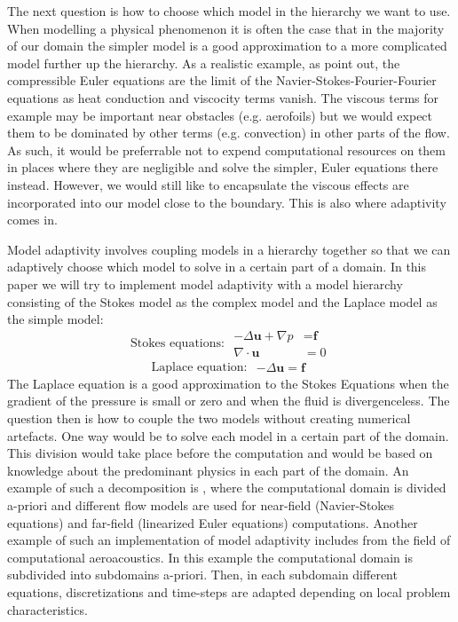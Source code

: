 \documentclass[12pt,a4paper]{article}
\theoremstyle{definition}
\begin{document}
The next question is how to choose which model in the hierarchy we want to use. When modelling a physical phenomenon it is often the case that in the majority of our domain the simpler model is a good approximation to a more complicated model further up the hierarchy.  As a realistic example, as \cite{giesselmann2017posteriori} point out, the compressible Euler equations are the limit of the Navier-Stokes-Fourier-Fourier equations as heat conduction and viscocity terms vanish.    The viscous terms for example may be important near obstacles (e.g. aerofoils) but we would expect them to be dominated by other terms (e.g. convection) in other parts of the flow.  As such, it would be preferrable not to expend computational resources on them in places where they are negligible and solve the simpler, Euler equations there instead.  However, we would still like to encapsulate the viscous effects are incorporated into our model close to the boundary.  This is also where adaptivity comes in.  


Model adaptivity involves coupling models in a hierarchy together so that we can adaptively choose which model to solve in a certain part of a domain.  In this paper we will try to implement model adaptivity with a model hierarchy consisting of the Stokes model as the complex model and the Laplace model as the simple model:
\begin{equation}
\text{Stokes equations: }
\begin{aligned}
	-\Delta\textbf{u} + \nabla p &= \textbf{f}\nonumber \\ 
\nabla\cdot \textbf{u}&= 0\nonumber
\end{aligned}
\end{equation}
\begin{equation}
\text{Laplace equation: }
\begin{aligned}
-\Delta\textbf{u} = \textbf{f} \nonumber
\end{aligned}
\end{equation}
The Laplace equation is a good approximation to the Stokes Equations when the gradient of the pressure is small or zero and when the fluid is divergenceless.   The question then is how to couple the two models without creating numerical artefacts. One way would be to solve each model in a certain part of the domain.  This division would take place before the computation and would be based on knowledge about the predominant physics in each part of the domain.  An example of such a decomposition is \cite{coclici2001analysis}, where the computational domain is divided a-priori and different flow models are used for near-field (Navier-Stokes equations) and far-field (linearized Euler equations) computations.  Another example of such an implementation of model adaptivity includes \cite{utzmann2006heterogeneous} from the field of computational aeroacoustics. In this example the computational domain is subdivided into subdomains a-priori.  Then, in each subdomain different equations, discretizations and time-steps are adapted depending on local problem characteristics.  
\end{document}
